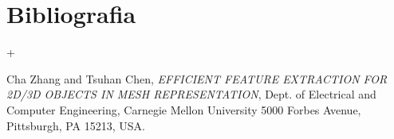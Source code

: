 

\cleardoublepage
\chapter{Bibliografia}

\nocite{*}

+\begin{thebibliography}{1}

Cha Zhang and Tsuhan Chen,
\emph{EFFICIENT FEATURE EXTRACTION FOR 2D/3D OBJECTS IN MESH REPRESENTATION},
Dept. of Electrical and Computer Engineering, Carnegie Mellon University 5000 Forbes 	Avenue, Pittsburgh, PA 15213, USA.

\end{thebibliography}